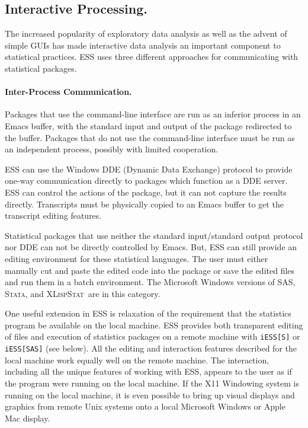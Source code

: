 \documentclass{article}
\newcommand*{\SAS}{\textsc{SAS}}
\newcommand*{\XLispStat}{\textsc{XLispStat}}
\newcommand*{\Stata}{\textsc{Stata}}
\newcommand{\stexttt}[1]{{\small\texttt{#1}}}
\begin{document}
\subsection{Interactive Processing.}
\label{sec:interactive}

The increased popularity of exploratory data analysis as well as the
advent of simple GUIs has made interactive data analysis an important
component to statistical practices.
ESS uses three different approaches for communicating with statistical
packages.

\paragraph{Inter-Process Communication.}
Packages that use the command-line interface are run as an inferior
process in an Emacs buffer, with the standard input and output of the
package redirected to the buffer.  Packages that do not use the
command-line interface must be run as an independent process, possibly
with limited cooperation.

ESS can use the Windows DDE (Dynamic Data Exchange) protocol to
provide one-way communication directly to packages which function as a
DDE server.  ESS can control the actions of the package, but it can not capture
the results directly.  Transcripts must be physically copied to an
Emacs buffer to get the transcript editing features.

Statistical packages that use neither the standard input/standard
output protocol nor DDE can not be directly controlled by Emacs.  But, ESS
can still provide an editing environment for these statistical languages.  The
user must either manually cut and paste the edited code into the
package or save the edited files and run them in a batch environment.
The Microsoft Windows versions of \SAS, \Stata, and \XLispStat\ are
in this category.

One useful extension in ESS is relaxation of the requirement that the
statistics program be available on the local machine.  ESS provides
both transparent editing of files and execution of statistics packages
on a remote machine with \stexttt{iESS[S]} or \stexttt{iESS[SAS]} (see
below).  All the editing and interaction features described for the
local machine work equally well on the remote machine.  The
interaction, including all the unique features of working with ESS,
appears to the user as if the program were running on the local
machine.  If the X11 Windowing system is running on the local machine,
it is even possible to bring up visual displays and graphics from
remote Unix systems onto a local Microsoft Windows or Apple Mac
display.
\end{document}
